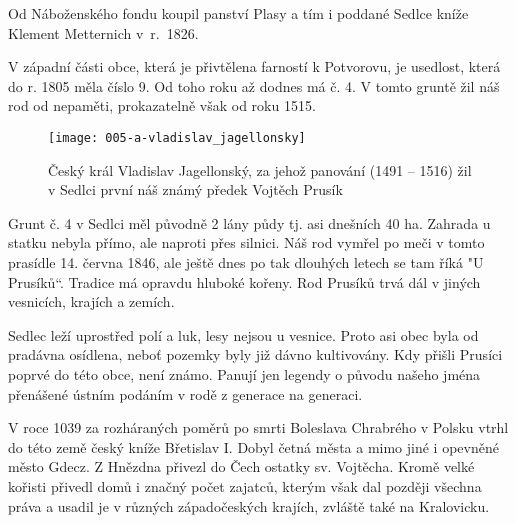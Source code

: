 \documentclass[../dejiny-rodu-prusiku.tex]{subfiles}
\begin{document}
Od Náboženského fondu koupil panství Plasy a tím i poddané Sedlce kníže Klement Metternich v~r.~1826.

V západní části obce, která je přivtělena farností k Potvorovu, je usedlost, která do r. 1805 měla číslo 9. Od toho roku až dodnes má č. 4. V tomto gruntě žil náš rod od nepaměti, prokazatelně však od roku 1515.


\begin{figure}
\centering
\texttt{[image: 005-a-vladislav\_jagellonsky]}
\caption{Český král Vladislav Jagellonský, za jehož panování (1491 – 1516) žil v Sedlci první náš známý předek Vojtěch Prusík}
\label{fig:005-a-vladislav_jagellonsky}
\end{figure}

Grunt č. 4 v Sedlci měl původně 2 lány půdy tj. asi dnešních 40 ha. Zahrada u statku nebyla přímo, ale napro­ti přes silnici. Náš rod vymřel po meči v tomto prasídle 14. června 1846, ale ještě dnes po tak dlouhých letech se tam říká "U Prusíků“. Tradice má opravdu hluboké ko­řeny. Rod Prusíků trvá dál v jiných vesnicích, krajích a zemích.

Sedlec leží uprostřed polí a luk, lesy nejsou u vesnice. Proto asi obec byla od pradávna osídlena, neboť pozemky byly již dávno kultivovány. Kdy přišli Prusíci poprvé do této obce, není známo. Panují jen legendy o původu našeho jména přenášené ústním podáním v rodě z generace na genera­ci.

V roce 1039 za rozháraných poměrů po smrti Boleslava Chrabrého v Polsku vtrhl do této země český kníže Břeti­slav I. Dobyl četná města a mimo jiné i opevněné město Gdecz. Z Hnězdna přivezl do Čech ostatky sv. Vojtěcha. Kromě velké kořisti přivedl domů i značný počet zajatců, kterým však dal později všechna práva a usadil je v růz­ných západočeských krajích, zvláště také na Kralovicku.
\end{document}
